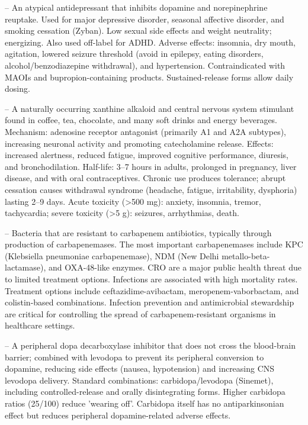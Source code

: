-- An atypical antidepressant that inhibits dopamine and norepinephrine reuptake. Used for major depressive disorder, seasonal affective disorder, and smoking cessation (Zyban). Low sexual side effects and weight neutrality; energizing. Also used off-label for ADHD. Adverse effects: insomnia, dry mouth, agitation, lowered seizure threshold (avoid in epilepsy, eating disorders, alcohol/benzodiazepine withdrawal), and hypertension. Contraindicated with MAOIs and bupropion-containing products. Sustained-release forms allow daily dosing.

-- A naturally occurring xanthine alkaloid and central nervous system stimulant found in coffee, tea, chocolate, and many soft drinks and energy beverages. Mechanism: adenosine receptor antagonist (primarily A1 and A2A subtypes), increasing neuronal activity and promoting catecholamine release. Effects: increased alertness, reduced fatigue, improved cognitive performance, diuresis, and bronchodilation. Half-life: 3--7 hours in adults, prolonged in pregnancy, liver disease, and with oral contraceptives. Chronic use produces tolerance; abrupt cessation causes withdrawal syndrome (headache, fatigue, irritability, dysphoria) lasting 2--9 days. Acute toxicity (>500 mg): anxiety, insomnia, tremor, tachycardia; severe toxicity (>5 g): seizures, arrhythmias, death.

-- Bacteria that are resistant to carbapenem antibiotics, typically through production of carbapenemases. The most important carbapenemases include KPC (Klebsiella pneumoniae carbapenemase), NDM (New Delhi metallo-beta-lactamase), and OXA-48-like enzymes. CRO are a major public health threat due to limited treatment options. Infections are associated with high mortality rates. Treatment options include ceftazidime-avibactam, meropenem-vaborbactam, and colistin-based combinations. Infection prevention and antimicrobial stewardship are critical for controlling the spread of carbapenem-resistant organisms in healthcare settings.

-- A peripheral dopa decarboxylase inhibitor that does not cross the blood-brain barrier; combined with levodopa to prevent its peripheral conversion to dopamine, reducing side effects (nausea, hypotension) and increasing CNS levodopa delivery. Standard combinations: carbidopa/levodopa (Sinemet), including controlled-release and orally disintegrating forms. Higher carbidopa ratios (25/100) reduce 'wearing off'. Carbidopa itself has no antiparkinsonian effect but reduces peripheral dopamine-related adverse effects.

